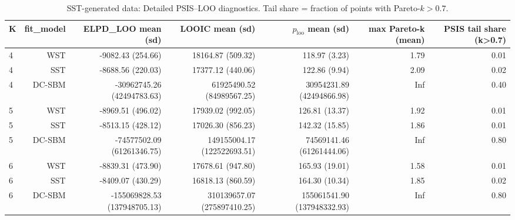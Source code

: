 \begin{table}[!h]
\centering
\caption{SST-generated data: Detailed PSIS–LOO diagnostics. Tail share = fraction of points with Pareto-\(k>0.7\).\\\label{tab:sst-appx-psis}}
\centering
\begin{tabular}[t]{lrrrrrr}
\toprule
K & fit_model & ELPD\_LOO mean (sd) & LOOIC mean (sd) & $p_{\text{loo}}$ mean (sd) & max Pareto-k (mean) & PSIS tail share (k>0.7)\\
\midrule
4 & WST & -9082.43 (254.66) & 18164.87 (509.32) & 118.97 (3.23) & 1.79 & 0.01\\
4 & SST & -8688.56 (220.03) & 17377.12 (440.06) & 122.86 (9.94) & 2.09 & 0.02\\
4 & DC-SBM & -30962745.26 (42494783.63) & 61925490.52 (84989567.25) & 30954231.89 (42494866.98) & Inf & 0.40\\
5 & WST & -8969.51 (496.02) & 17939.02 (992.05) & 126.81 (13.37) & 1.92 & 0.01\\
5 & SST & -8513.15 (428.12) & 17026.30 (856.23) & 142.32 (15.85) & 1.86 & 0.01\\
5 & DC-SBM & -74577502.09 (61261346.75) & 149155004.17 (122522693.51) & 74569141.46 (61261444.06) & Inf & 0.80\\
6 & WST & -8839.31 (473.90) & 17678.61 (947.80) & 165.93 (19.01) & 1.58 & 0.01\\
6 & SST & -8409.07 (430.29) & 16818.13 (860.59) & 164.30 (10.34) & 1.85 & 0.02\\
6 & DC-SBM & -155069828.53 (137948705.13) & 310139657.07 (275897410.25) & 155061541.90 (137948332.93) & Inf & 0.80\\
\bottomrule
\end{tabular}
\end{table}

